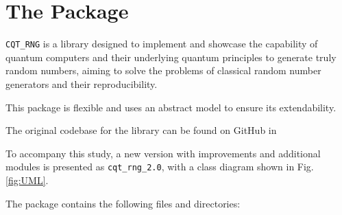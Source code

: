 \section{The Package}

\texttt{CQT\_RNG} is a library designed to implement and showcase the capability of quantum computers and their underlying quantum principles to generate truly random numbers, aiming to solve the problems of classical random number generators and their reproducibility.


This package is flexible and uses an abstract model to ensure its extendability.


The original codebase for the library can be found on GitHub in \cite{git}

To accompany this study, a new version with improvements and additional modules is presented as \texttt{cqt\_rng\_2.0}, with a class diagram shown in Fig. \ref{fig:UML}.



The package contains the following files and directories:

